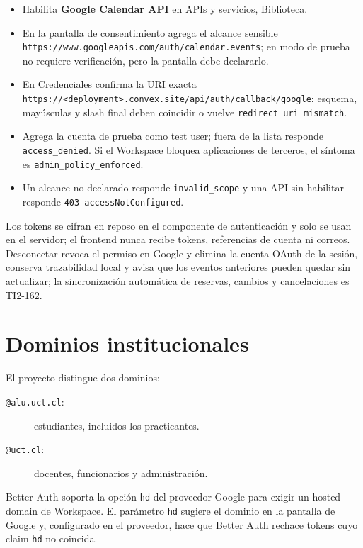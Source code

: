 \documentclass[11pt,a4paper]{article}
\begin{document}
\begin{itemize}
  \item Habilita \textbf{Google Calendar API} en APIs y servicios, Biblioteca.
  \item En la pantalla de consentimiento agrega el alcance sensible
    \texttt{https://www.googleapis.com/auth/calendar.events}; en modo de
    prueba no requiere verificación, pero la pantalla debe declararlo.
  \item En Credenciales confirma la URI exacta
    \texttt{https://<deployment>.convex.site/api/auth/callback/google}:
    esquema, mayúsculas y slash final deben coincidir o vuelve
    \texttt{redirect\_uri\_mismatch}.
  \item Agrega la cuenta de prueba como test user; fuera de la lista responde
    \texttt{access\_denied}. Si el Workspace bloquea aplicaciones de terceros,
    el síntoma es \texttt{admin\_policy\_enforced}.
  \item Un alcance no declarado responde \texttt{invalid\_scope} y una API sin
    habilitar responde \texttt{403 accessNotConfigured}.
\end{itemize}

Los tokens se cifran en reposo en el componente de autenticación y solo se
usan en el servidor; el frontend nunca recibe tokens, referencias de cuenta ni
correos. Desconectar revoca el permiso en Google y elimina la cuenta OAuth de
la sesión, conserva trazabilidad local y avisa que los eventos anteriores
pueden quedar sin actualizar; la sincronización automática de reservas,
cambios y cancelaciones es TI2-162.

\section{Dominios institucionales}

El proyecto distingue dos dominios:

\begin{description}
  \item[\texttt{@alu.uct.cl}:] estudiantes, incluidos los practicantes.
  \item[\texttt{@uct.cl}:] docentes, funcionarios y administración.
\end{description}

Better Auth soporta la opción \texttt{hd} del proveedor Google para exigir un
hosted domain de Workspace. El parámetro \texttt{hd} sugiere el dominio en la
pantalla de Google y, configurado en el proveedor, hace que Better Auth
rechace tokens cuyo claim \texttt{hd} no coincida.
\end{document}
